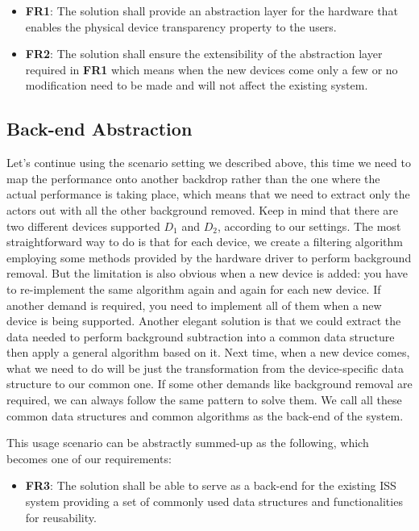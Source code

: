 \begin{itemize}
    \item \textbf{FR1}: The solution shall provide an abstraction layer for the
    hardware that enables the physical device transparency property to
    the users.
    \item \textbf{FR2}: The solution shall ensure the extensibility of the
    abstraction layer required in \textbf{FR1} which means when the new devices
    come only a few or no modification need to be made and will not affect the
    existing system.
\end{itemize}

\subsection{Back-end Abstraction}
\label{sec:intro-sq-abs}

Let's continue using the scenario setting we described above, this time we need
to map the performance onto another backdrop rather than the one where the
actual performance is taking place, which means that we need to extract only
the actors out with all the other background removed. Keep in mind that
there are two different devices supported $D_1$ and $D_2$, according to our
settings. The most straightforward way to do is that for each device, we
create a filtering algorithm employing some methods provided by the hardware
driver to perform background removal. But the limitation is also obvious when
a new device is added: you have to re-implement the same algorithm again and
again for each new device. If another demand is required, you need to implement 
all of them when a new device is being supported.
Another elegant solution is that we could extract the data needed to perform
background subtraction into a common data structure then apply a general
algorithm based on it. Next time, when a new device comes, what we need to do
will be just the transformation from the device-specific data structure to our
common one. If some other demands like background removal are required, we can
always follow the same pattern to solve them. We call all these common data 
structures and common algorithms as the back-end of the system.

This usage scenario can be abstractly summed-up as the following, which becomes
one of our requirements:

\begin{itemize}
    \item \textbf{FR3}: The solution shall be able to serve as a back-end 
    for the existing ISS system providing a set of commonly used data 
    structures and functionalities for reusability.
\end{itemize}

